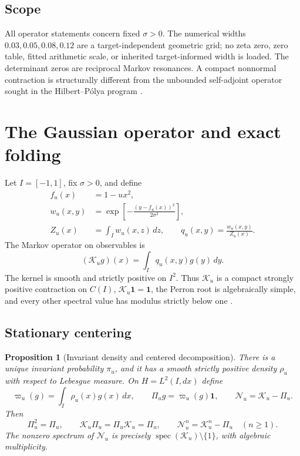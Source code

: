 \documentclass[11pt]{article}
\newtheorem{proposition}[theorem]{Proposition}
\theoremstyle{definition}
\theoremstyle{remark}
\newcommand{\cK}{\mathcal K}
\newcommand{\cN}{\mathcal N}
\newcommand{\spec}{\operatorname{spec}}
\newcommand{\one}{\mathbf 1}
\begin{document}
\subsection*{Scope}

All operator statements concern fixed $\sigma>0$.  The numerical widths
$0.03,0.05,0.08,0.12$ are a target-independent geometric grid; no zeta zero,
zero table, fitted arithmetic scale, or inherited target-informed width is
loaded.  The determinant zeros are reciprocal Markov resonances.  A compact
nonnormal contraction is structurally different from the unbounded
self-adjoint operator sought in the Hilbert--P\'olya program
\citep{Edwards1974,BerryKeating1999,Connes1999}.

\section{The Gaussian operator and exact folding}
\label{sec:folding}

Let $I=[-1,1]$, fix $\sigma>0$, and define
\begin{align}
 f_u(x)&=1-u x^2,\label{eq:map}\\
 w_u(x,y)&=\exp\left[-\frac{(y-f_u(x))^2}{2\sigma^2}\right],\label{eq:weight}\\
 Z_u(x)&=\int_Iw_u(x,z)\,dz,
 \qquad q_u(x,y)=\frac{w_u(x,y)}{Z_u(x)}.\label{eq:kernel}
\end{align}
The Markov operator on observables is
\begin{equation}\label{eq:operator}
 (\cK_u g)(x)=\int_Iq_u(x,y)g(y)\,dy.
\end{equation}
The kernel is smooth and strictly positive on $I^2$.  Thus $\cK_u$ is a
compact strongly positive contraction on $C(I)$, $\cK_u\one=\one$, the Perron
root is algebraically simple, and every other spectral value has modulus
strictly below one \citep{Schaefer1974,WangContinuum2026}.

\subsection{Stationary centering}

\begin{proposition}[Invariant density and centered decomposition]
\label{prop:stationary}
There is a unique invariant probability $\pi_u$, and it has a smooth strictly
positive density $\rho_u$ with respect to Lebesgue measure.  On
$H=L^2(I,dx)$ define
\[
 \varpi_u(g)=\int_I\rho_u(x)g(x)\,dx,
 \qquad \Pi_u g=\varpi_u(g)\one,
 \qquad \cN_u=\cK_u-\Pi_u.
\]
Then
\[
 \Pi_u^2=\Pi_u,
 \qquad \cK_u\Pi_u=\Pi_u\cK_u=\Pi_u,
 \qquad \cN_u^n=\cK_u^n-\Pi_u \quad(n\ge1).
\]
The nonzero spectrum of $\cN_u$ is precisely
$\spec(\cK_u)\setminus\{1\}$, with algebraic multiplicity.
\end{proposition}
\end{document}
